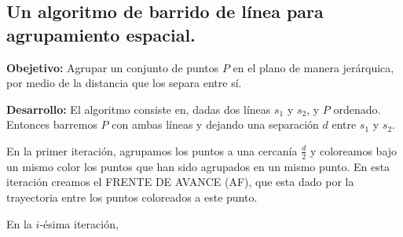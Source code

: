 \subsection[Expositor: Adrián Aguilera.]{Un algoritmo de barrido de línea para agrupamiento espacial.}
\textbf{Obejetivo:} Agrupar un conjunto de puntos $P$ en el plano de manera
jerárquica, por medio de la distancia que los separa entre sí. \newline

\textbf{Desarrollo:} El algoritmo consiste en, dadas dos líneas
$s_1$ y $s_2$, y $P$ ordenado. Entonces barremos $P$ con ambas
líneas y dejando una separación $d$ entre $s_1$ y $s_2$. \newline

En la primer iteración, agrupamos los puntos a una cercanía $\frac{d}{2}$ y coloreamos
bajo un mismo color los puntos que han sido agrupados en un mismo punto. En esta iteración
creamos el FRENTE DE AVANCE (AF), que esta dado por la trayectoria entre los puntos
coloreados a este punto. \newline

En la $i$-ésima iteración,

